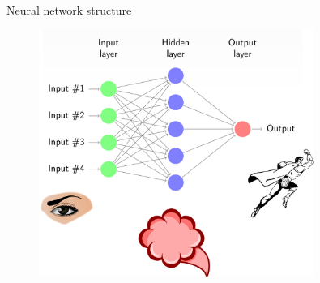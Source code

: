 \begin{frame}{Neural network structure}
\begin{figure}
\centering
\includegraphics[width=0.8\textwidth]{net_structure}
\end{figure}
\end{frame}

